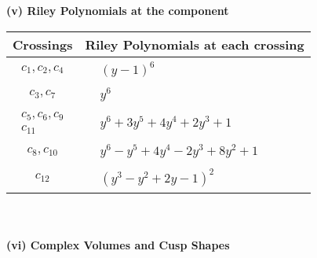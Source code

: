 \documentclass[1p]{elsarticle_modified}
\theoremstyle{definition}
\begin{document}
\newpage\renewcommand{\arraystretch}{1}
\flushleft \textbf{(v) Riley Polynomials at the component}\newline \\
\begin{tabular}{m{50pt}|m{274pt}}
Crossings & \hspace{64pt}Riley Polynomials at each crossing \\
\hline $$\begin{aligned}c_{1},c_{2},c_{4}\end{aligned}$$&$\begin{aligned}
&(y-1)^6
\end{aligned}$\\
\hline $$\begin{aligned}c_{3},c_{7}\end{aligned}$$&$\begin{aligned}
&y^6
\end{aligned}$\\
\hline $$\begin{aligned}c_{5},c_{6},c_{9}\\c_{11}\end{aligned}$$&$\begin{aligned}
&y^6+3 y^5+4 y^4+2 y^3+1
\end{aligned}$\\
\hline $$\begin{aligned}c_{8},c_{10}\end{aligned}$$&$\begin{aligned}
&y^6- y^5+4 y^4-2 y^3+8 y^2+1
\end{aligned}$\\
\hline $$\begin{aligned}c_{12}\end{aligned}$$&$\begin{aligned}
&(y^3- y^2+2 y-1)^2
\end{aligned}$\\
\hline
\end{tabular}\\~\\
\newpage\flushleft \textbf{(vi) Complex Volumes and Cusp Shapes}
\end{document}
